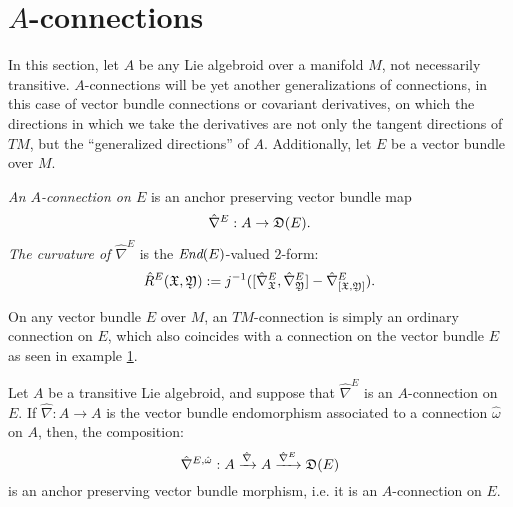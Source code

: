 \section{$A$-connections}


In this section, let $A$ be any Lie algebroid over a manifold $M$, not necessarily transitive. $A$-connections will be yet another generalizations of connections, in this case of vector bundle connections or covariant derivatives, on which the directions in which we take the derivatives are not only the tangent directions of $TM$, but the ``generalized directions'' of $A$. Additionally, let $E$ be a vector bundle over $M$.

\begin{definition}
\emph{An $A$-connection on $E$} is an anchor preserving vector bundle map
\begin{equation}
    \hat \nabla^E: A \to \mathfrak{D}(E).
\end{equation}
\emph{The curvature of $\hat \nabla^E$} is the $\operatorname{\textit{End}}(E)$-valued $2$-form:
\begin{equation}
    \hat R^E(\mathfrak{X}, \mathfrak{Y}) := j^{-1}([\hat \nabla^E_{\mathfrak{X}}, \hat \nabla^E_{\mathfrak{Y}}] - \hat \nabla^E_{[\mathfrak{X}, \mathfrak{Y}]}).
\end{equation}
\end{definition}

\begin{example}
On any vector bundle $E$ over $M$, an $TM$-connection is simply an ordinary connection on $E$, which also coincides with a connection on the vector bundle $E$ as seen in example \ref{}.
\end{example}

\begin{example}
Let $A$ be a transitive Lie algebroid, and suppose that $\hat \nabla^E$ is an $A$-connection on $E$. If $\hat \nabla:A \to A$ is the vector bundle endomorphism associated to a connection $\hat \omega$ on $A$, then, the composition:
\begin{equation}
    \hat \nabla^{E, \hat \omega} : A \xrightarrow{\hat \nabla} A \xrightarrow{\hat \nabla^E} \mathfrak{D}(E)
\end{equation}
is an anchor preserving vector bundle morphism, i.e. it is an $A$-connection on $E$.
\end{example}

